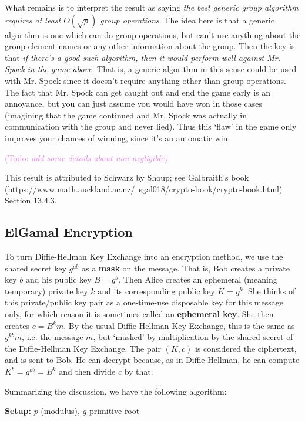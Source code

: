 \documentclass{article}
\theoremstyle{plain}
\theoremstyle{definition}
\theoremstyle{remark}
\numberwithin{theorem}{section}
\newcommand{\KS}[1]{\textcolor{violet}{{\sf (Todo:} {\sl{#1})}}}
\newcommand{\KS}[1]{}
\begin{document}
What remains is to interpret the result as saying \emph{the best generic group algorithm requires at least $O(\sqrt{p})$ group operations}.  The idea here is that a generic algorithm is one which can do group operations, but can't use anything about the group element names or any other information about the group.  Then the key is that \emph{if there's a good such algorithm, then it would perform well against Mr. Spock in the game above}.  That is, a generic algorithm in this sense could be used with Mr. Spock since it doesn't require anything other than group operations.  The fact that Mr. Spock can get caught out and end the game early is an annoyance, but you can just assume you would have won in those cases (imagining that the game continued and Mr. Spock was actually in communication with the group and never lied).  Thus this `flaw' in the game only improves your chances of winning, since it's an automatic win.

\KS{add some details about non-negligible}

This result is attributed to Schwarz by Shoup; see Galbraith's book (https://www.math.auckland.ac.nz/~sgal018/crypto-book/crypto-book.html) Section 13.4.3.


\subsection{ElGamal Encryption}

To turn Diffie-Hellman Key Exchange into an encryption method, we use the shared secret key $g^{ab}$ as a \textbf{mask} on the message.  That is, Bob creates a private key $b$ and his public key $B = g^b$.  Then Alice creates an ephemeral (meaning temporary) private key $k$ and its corresponding public key $K = g^k$.  She thinks of this private/public key pair as a one-time-use disposable key for this message only, for which reason it is sometimes called an \textbf{ephemeral key}.  She then creates $c = B^k m$.  By the usual Diffie-Hellman Key Exchange, this is the same as $g^{kb}m$, i.e. the message $m$, but `masked' by multiplication by the shared secret of the Diffie-Hellman Key Exchange.  The pair $(K, c)$ is considered the ciphertext, and is sent to Bob.  He can decrypt because, as in Diffie-Hellman, he can compute $K^b = g^{kb} = B^k$ and then divide $c$ by that.

Summarizing the discussion, we have the following algorithm:

     {\bf Setup:}  $p$ (modulus), $g$ primitive root
     \vspace{1em}
\end{document}

